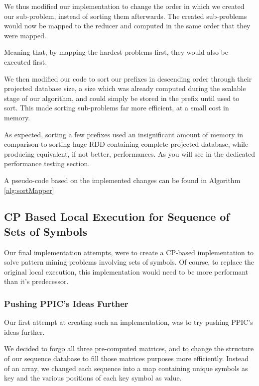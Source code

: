 \documentclass{eplmastersthesis}
\begin{document}
We thus modified our implementation to change the order in which we created our sub-problem, instead of sorting them afterwards. The created sub-problems would now be mapped to the reducer and computed in the same order that they were mapped.\newline

Meaning that, by mapping the hardest problems first, they would also be executed first. \newline

We then modified our code to sort our prefixes in descending order through their projected database size, a size which was already computed during the scalable stage of our algorithm, and could simply be stored in the prefix until used to sort. This made sorting sub-problems far more efficient, at a small cost in memory. \newline

As expected, sorting a few prefixes used an insignificant amount of memory in comparison to sorting huge RDD containing complete projected database, while producing equivalent, if not better, performances. As you will see in the dedicated performance testing section. \newline

A pseudo-code based on the implemented changes can be found in Algorithm \ref{alg:sortMapper}

\subsection{CP Based Local Execution for Sequence of Sets of Symbols}

Our final implementation attempts, were to create a CP-based implementation to solve pattern mining problems involving sets of symbols. Of course, to replace the original local execution, this implementation would need to be more performant than it's predecessor.

\subsubsection{Pushing PPIC's Ideas Further}

Our first attempt at creating such an implementation, was to try pushing PPIC's ideas further. \newline

We decided to forgo all three pre-computed matrices, and to change the structure of our sequence database to fill those matrices purposes more efficiently. Instead of an array, we changed each sequence into a map containing unique symbols as key and the various positions of each key symbol as value. \newline
\end{document}
